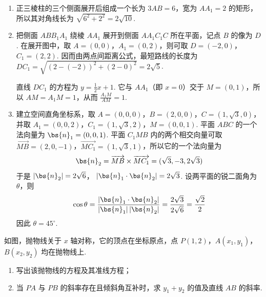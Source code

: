 \begin{solution}
\begin{enumerate}
\item 正三棱柱的三个侧面展开后组成一个长为
\(3AB=6\)，宽为 \(AA_{1}=2\) 的矩形，所以其对角线长为
\(\sqrt{6^{2}+2^{2}}=2\sqrt{10}\).

\item 把侧面 \(ABB_{1}A_{1}\) 绕棱 \(AA_{1}\) 展开到侧面
\(AA_{1}C_{1}C\) 所在平面，记点 \(B\) 的像为 \(D\). 在展开图中，取
\(A=(0,0)\)，\(A_{1}=(0,2)\)，则可取
\(D=(-2,0)\)，\(C_{1}=(2,2)\). 因而由两点间距离公式，最短路线的长度为
\(DC_{1}=\sqrt{(2-(-2))^{2}+(2-0)^{2}}=2\sqrt{5}\).

直线 \(DC_{1}\) 的方程为 \(y=\frac{1}{2}x+1\). 它与
\(AA_{1}\)（即 \(x=0\)）交于 \(M=(0,1)\)，所以 \(AM=A_{1}M=1\)，从而
\(\frac{A_{1}M}{AM}=1\).

\item 建立空间直角坐标系，取 \(A=(0,0,0)\)，\(B=(2,0,0)\)，\(C=(1,\sqrt{3},0)\)，
并取 \(A_{1}=(0,0,2)\)，\(C_{1}=(1,\sqrt{3},2)\)，\(M=(0,0,1)\).
平面 \(ABC\) 的一个法向量为 \(\bs{n}_{1}=(0,0,1)\). 平面
\(C_{1}MB\) 内的两个相交向量可取
\(\overrightarrow{MB}=(2,0,-1)\)，\(\overrightarrow{MC_{1}}=(1,\sqrt{3},1)\)，所以它的一个法向量为
\[
\bs{n}_{2}=\overrightarrow{MB}\times\overrightarrow{MC_{1}}
=(\sqrt{3},-3,2\sqrt{3})
\]
于是 \(\left\lvert\bs{n}_{2}\right\rvert=2\sqrt{6}\)，
\(\left\lvert\bs{n}_{1}\cdot\bs{n}_{2}\right\rvert=2\sqrt{3}\).
设两平面的锐二面角为 \(\theta\)，则
\[
\cos\theta=\frac{\left\lvert\bs{n}_{1}\cdot\bs{n}_{2}\right\rvert}
{\left\lvert\bs{n}_{1}\right\rvert\left\lvert\bs{n}_{2}\right\rvert}
=\frac{2\sqrt{3}}{2\sqrt{6}}=\frac{\sqrt{2}}{2}
\]
因此 \(\theta=45^{\circ}\).
\end{enumerate}
\end{solution}

\begin{problem}
如图，抛物线关于 \(x\) 轴对称，它的顶点在坐标原点，点 \(P(1,2)\)，\(A(x_{1},y_{1})\)，\(B(x_{2},y_{2})\) 均在抛物线上.

\begin{enumerate}
\item 写出该抛物线的方程及其准线方程；
\item 当 \(PA\) 与 \(PB\) 的斜率存在且倾斜角互补时，求 \(y_{1}+y_{2}\) 的值及直线 \(AB\) 的斜率.
\end{enumerate}

\end{problem}

